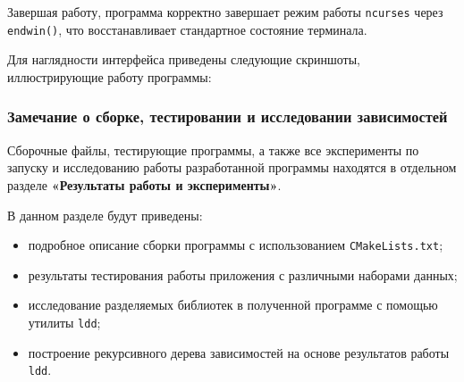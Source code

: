 Завершая работу, программа корректно завершает режим работы \texttt{ncurses} через \texttt{endwin()}, что восстанавливает стандартное состояние терминала.

\vspace{0.2cm}

Для наглядности интерфейса приведены следующие скриншоты, иллюстрирующие работу программы:


\subsubsection*{Замечание о сборке, тестировании и исследовании зависимостей}

Сборочные файлы, тестирующие программы, а также все эксперименты по запуску и исследованию работы разработанной программы находятся в отдельном разделе \textbf{«Результаты работы и эксперименты»}.

\vspace{0.3cm}

В данном разделе будут приведены:
\begin{itemize}
    \item подробное описание сборки программы с использованием \texttt{CMakeLists.txt};
    \item результаты тестирования работы приложения с различными наборами данных;
    \item исследование разделяемых библиотек в полученной программе с помощью утилиты \texttt{ldd};
    \item построение рекурсивного дерева зависимостей на основе результатов работы \texttt{ldd}.
\end{itemize}